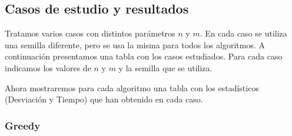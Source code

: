 \documentclass{article}
\begin{document}
\subsection{Casos de estudio y resultados}

Tratamos varios casos con distintos parámetros $n$ y $m$. En cada caso se utiliza una semilla diferente, pero se usa la misma para todos los algoritmos.
A continuación presentamos una tabla con los casos estudiados. Para cada caso indicamos los valores de $n$ y $m$ y la semilla
que se utiliza.

Ahora mostraremos para cada algoritmo una tabla con los estadísticos (Desviación y Tiempo) que han obtenido en cada
caso.

\pagebreak

\subsubsection*{Greedy}
\end{document}
